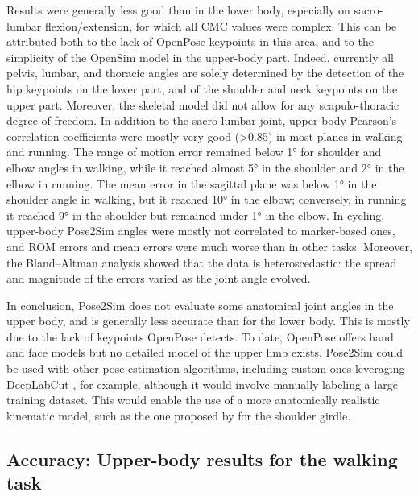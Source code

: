 Results were generally less good than in the lower body, especially on sacro-lumbar flexion/extension, for which all CMC values were complex. This can be attributed both to the lack of OpenPose keypoints in this area, and to the simplicity of the OpenSim model in the upper-body part. Indeed, currently all pelvis, lumbar, and thoracic angles are solely determined by the detection of the hip keypoints on the lower part, and of the shoulder and neck keypoints on the upper part. Moreover, the skeletal model did not allow for any scapulo-thoracic degree of freedom. In addition to the sacro-lumbar joint, upper-body Pearson’s correlation coefficients were mostly very good (>0.85) in most planes in walking and running. The range of motion error remained below 1° for shoulder and elbow angles in walking, while it reached almost 5° in the shoulder and 2° in the elbow in running. The mean error in the sagittal plane was below 1° in the shoulder angle in walking, but it reached 10° in the elbow; conversely, in running it reached 9° in the shoulder but remained under 1° in the elbow. In cycling, upper-body Pose2Sim angles were mostly not correlated to marker-based ones, and ROM errors and mean errors were much worse than in other tasks. Moreover, the Bland–Altman analysis showed that the data is heteroscedastic: the spread and magnitude of the errors varied as the joint angle evolved.

In conclusion, Pose2Sim does not evaluate some anatomical joint angles in the upper body, and is generally less accurate than for the lower body. This is mostly due to the lack of keypoints OpenPose detects. To date, OpenPose offers hand and face models but no detailed model of the upper limb exists. Pose2Sim could be used with other pose estimation algorithms, including custom ones leveraging DeepLabCut \cite{Mathis2018,Lauer2022}, for example, although it would involve manually labeling a large training dataset. This would enable the use of a more anatomically realistic kinematic model, such as the one proposed by \cite{Seth2016} for the shoulder girdle.

\clearpage
\subsection{Accuracy: Upper-body results for the walking task}

